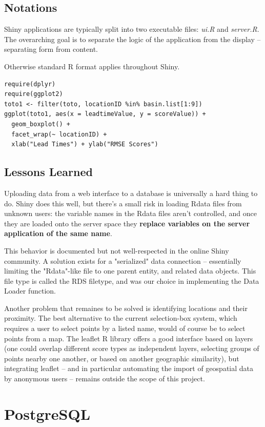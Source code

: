 \documentclass[logos,parttoc,morelanguage=french,morelanguage=german]{orsay-memoire}
\begin{document}
\subsection{Notations}
Shiny applications are typically split into two executable files: \textit{ui.R} and \textit{server.R}. The overarching goal is to separate the logic of the application from the display -- separating form from content.

Otherwise standard R format applies throughout Shiny.

\begin{verbatim}
require(dplyr)
require(ggplot2)
toto1 <- filter(toto, locationID %in% basin.list[1:9])
ggplot(toto1, aes(x = leadtimeValue, y = scoreValue)) +
  geom_boxplot() +
  facet_wrap(~ locationID) +
  xlab("Lead Times") + ylab("RMSE Scores")
\end{verbatim}

\subsection{Lessons Learned}
Uploading data from a web interface to a database is universally a hard thing to do. Shiny does this well, but there's a small risk in loading Rdata files from unknown users: the variable names in the Rdata files aren't controlled, and once they are loaded onto the server space they \textbf{replace variables on the server application of the same name}.

This behavior is documented but not well-respected in the online Shiny community. A solution exists for a "serialized" data connection -- essentially limiting the "Rdata"-like file to one parent entity, and related data objects. This file type is called the RDS filetype, and was our choice in implementing the Data Loader function.

Another problem that remaines to be solved is identifying locations and their proximity. The best alternative to the current selection-box system, which requires a user to select points by a listed name, would of course be to select points from a map. The leaflet R library offers a good interface based on layers (one could overlap different score types as independent layers, selecting groups of points nearby one another, or based on another geographic similarity), but integrating leaflet -- and in particular automating the import of geospatial data by anonymous users -- remains outside the scope of this project.


\section{PostgreSQL}
\end{document}
